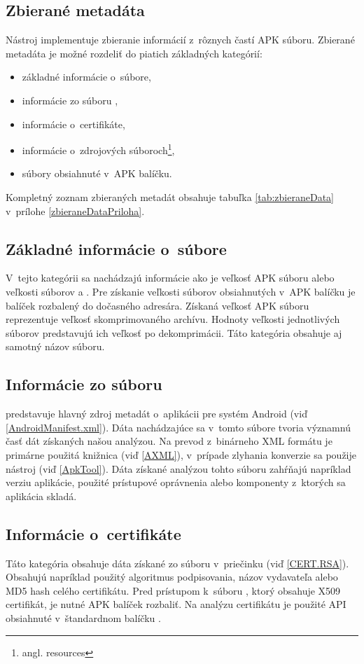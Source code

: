 \subsection{Zbierané metadáta}
Nástroj  implementuje zbieranie informácií z~rôznych častí APK súboru. Zbierané metadáta je možné rozdeliť do piatich základných kategórií:
\begin{itemize}
\item základné informácie o~súbore,
\item informácie zo súboru ,
\item informácie o~certifikáte,
\item informácie o~zdrojových súboroch\footnote{angl. resources},
\item súbory obsiahnuté v~APK balíčku.
\end{itemize}

\noindent Kompletný zoznam zbieraných metadát obsahuje tabuľka \ref{tab:zbieraneData} v~prílohe \ref{zbieraneDataPriloha}.

\subsection*{Základné informácie o~súbore} 
V~tejto kategórii sa nachádzajú informácie ako je veľkosť APK súboru alebo veľkosti súborov  a . Pre získanie veľkosti súborov obsiahnutých v~APK balíčku je balíček rozbalený do dočasného adresára. Získaná veľkosť APK súboru reprezentuje veľkosť skomprimovaného archívu. Hodnoty veľkosti jednotlivých súborov predstavujú ich veľkosť po dekomprimácii. Táto kategória obsahuje aj samotný názov súboru. 
\subsection*{Informácie zo súboru } 
 predstavuje hlavný zdroj metadát o~aplikácii pre systém Android (viď \ref{AndroidManifest.xml}). Dáta nachádzajúce sa v~tomto súbore tvoria významnú časť dát získaných našou analýzou. Na prevod z~binárneho XML formátu je primárne použitá knižnica  (viď \ref{AXML}), v~prípade zlyhania konverzie sa použije  nástroj  (viď \ref{ApkTool}). Dáta získané analýzou tohto súboru zahŕňajú napríklad verziu aplikácie, použité prístupové oprávnenia alebo komponenty z~ktorých sa aplikácia skladá.
\subsection*{Informácie o~certifikáte}
Táto kategória obsahuje dáta získané zo súboru  v~priečinku  (viď \ref{CERT.RSA}). Obsahujú napríklad použitý algoritmus podpisovania, názov vydavateľa alebo MD5 hash celého certifikátu. Pred prístupom k~súboru , ktorý obsahuje X509 certifikát, je nutné APK balíček rozbaliť. Na analýzu certifikátu je použité API obsiahnuté v~štandardnom balíčku .
